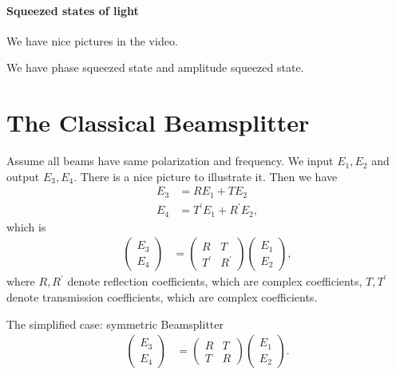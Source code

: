 \documentclass[../../note.tex]{subfiles}
\begin{document}
\paragraph{Squeezed states of light}
We have nice pictures in the video.

We have phase squeezed state and amplitude squeezed state.


\section{The Classical Beamsplitter}
Assume all beams have same polarization and frequency. We input $E_1, E_2$ and output $E_3, E_4$. There is a nice picture to illustrate it. Then we have
\begin{align}
    E_3 
    &= R E_1 + T E_2 \\
    E_4 
    &= T^\prime E_1 + R^\prime E_2,
\end{align}
which is 
\begin{align}
    \left(\begin{matrix}
        E_3 \\
        E_4
    \end{matrix}\right)
    &=  \left(\begin{matrix}
        R & T \\
        T^\prime & R^\prime 
    \end{matrix}\right) 
    \left(\begin{matrix}
        E_1 \\
        E_2
    \end{matrix}\right),
\end{align}
where $R, R^\prime$ denote reflection coefficients, which are complex coefficients, $T, T^\prime$ denote transmission coefficients, which are complex coefficients. 

The simplified case: symmetric Beamsplitter
\begin{align}
    \label{eq: classical beam splitter}
    \left(\begin{matrix}
        E_3 \\
        E_4
    \end{matrix}\right)
    &=  \left(\begin{matrix}
        R & T \\
        T & R 
    \end{matrix}\right) 
    \left(\begin{matrix}
        E_1 \\
        E_2
    \end{matrix}\right).
\end{align}
\end{document}
